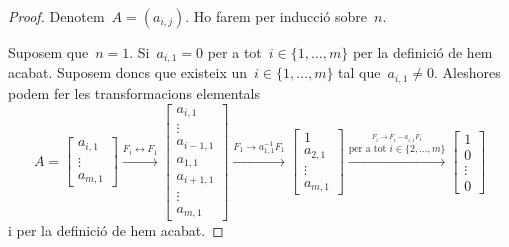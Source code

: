 \documentclass[../algebra-lineal.tex]{subfiles}
\begin{document}
    \begin{proof} %
        Denotem~\(A=(a_{i,j})\).
        Ho farem per inducció sobre~\(n\).

        Suposem que~\(n=1\).
        Si~\(a_{i,1}=0\) per a tot~\(i\in\{1,\dots,m\}\) per la definició de  hem acabat.
        Suposem doncs que existeix un~\(i\in\{1,\dots,m\}\) tal que~\(a_{i,1}\neq0\).
        Aleshores podem fer les transformacions elementals
        \[A=
        \left[\begin{matrix}
        a_{i,1}\\
        \vdots\\
        a_{m,1}
        \end{matrix}\right]
        \overset{F_{i}\leftrightarrow F_{1}}{\longrightarrow}
        \left[\begin{matrix}
        a_{i,1}\\
        \vdots\\
        a_{i-1,1}\\
        a_{1,1}\\
        a_{i+1,1}\\
        \vdots\\
        a_{m,1}
        \end{matrix}\right]
        \overset{F_{1}\rightarrow a_{1,1}^{-1}F_{1}}{\longrightarrow}
        \left[\begin{matrix}
        1\\
        a_{2,1}\\
        \vdots\\
        a_{m,1}
        \end{matrix}\right]
        \overset{\overset{F_{i}\rightarrow F_{i}-a_{i,1}F_{1}}{\text{per a tot }i\in\{2,\dots,m\}}}{\longrightarrow}
        \left[\begin{matrix}
        1\\
        0\\
        \vdots\\
        0
        \end{matrix}\right]\]
        i per la definició de  hem acabat.


\end{proof}
\end{document}
